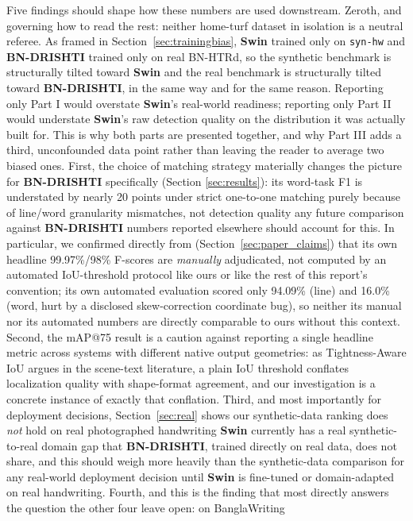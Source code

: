 \documentclass[11pt]{article}
\newcommand{\swin}{\textbf{Swin}}
\newcommand{\bnd}{\textbf{BN-DRISHTI}}
\begin{document}
Five findings should shape how these numbers are used downstream. Zeroth, and
governing how to read the rest: neither home-turf dataset in isolation is a neutral
referee. As framed in Section~\ref{sec:trainingbias}, \swin{} trained only on
\texttt{syn-hw} and \bnd{} trained only on real BN-HTRd, so the synthetic benchmark is
structurally tilted toward \swin{} and the real benchmark is structurally tilted toward
\bnd{}, in the same way and for the same reason. Reporting only Part I would overstate
\swin's real-world readiness; reporting only Part II would understate \swin's raw
detection quality on the distribution it was actually built for. This is why both parts
are presented together, and why Part III adds a third, unconfounded data point rather
than leaving the reader to average two biased ones. First, the choice
of matching strategy materially changes the picture for \bnd{} specifically (Section
\ref{sec:results}): its word-task F1 is understated by nearly 20 points under strict
one-to-one matching purely because of line/word granularity mismatches, not detection
quality \textemdash{} any future comparison against \bnd{} numbers reported elsewhere
should account for this. In particular, we confirmed directly from
\cite{jubaer2023bndrishti} (Section~\ref{sec:paper_claims}) that its own headline
99.97\%/98\% F-scores are \emph{manually} adjudicated, not computed by an automated
IoU-threshold protocol like ours or like the rest of this report's convention; its own
automated evaluation scored only 94.09\% (line) and 16.0\% (word, hurt by a disclosed
skew-correction coordinate bug), so neither its manual nor its automated numbers are
directly comparable to ours without this context. Second, the mAP@75 result is a
caution against reporting a single headline metric across systems with different
native output geometries: as Tightness-Aware IoU \cite{liu2019tiou} argues in the
scene-text literature, a plain IoU threshold conflates localization quality with
shape-format agreement, and our investigation is a concrete instance of exactly that
conflation. Third, and most importantly for deployment decisions, Section~\ref{sec:real}
shows our synthetic-data ranking does \emph{not} hold on real photographed handwriting
\textemdash{} \swin{} currently has a real synthetic-to-real domain gap that \bnd{},
trained directly on real data, does not share, and this should weigh more heavily than
the synthetic-data comparison for any real-world deployment decision until \swin{} is
fine-tuned or domain-adapted on real handwriting. Fourth, and this is the finding that
most directly answers the question the other four leave open: on BanglaWriting
\end{document}
